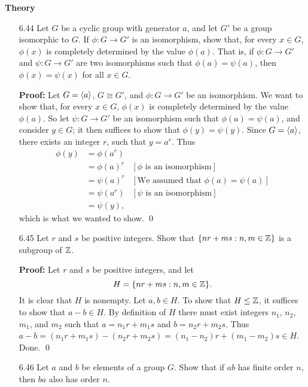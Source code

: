 \noindent      \textbf{Theory}

\begin{enumerate}
   \item[6.44] Let $G$ be a cyclic group with generator $a$, and let $G'$ be a
               group isomorphic to $G$. If $\phi : G \rightarrow G'$ is an
               isomorphism, show that, for every $x \in G$, $\phi(x)$ is
               completely determined by the value $\phi(a)$. That is, if
               $\phi : G \rightarrow G'$ and $\psi : G \rightarrow G'$ are two
               isomorphisms such that $\phi(a) = \psi(a)$, then
               $\phi(x) = \psi(x)$ for all $x \in G$.

      \textbf{Proof:} Let $G = \langle a \rangle$, $G \cong G'$, and
      $\phi : G \rightarrow G'$ be an isomorphism. We want to show that, for 
      every $x \in G$, $\phi(x)$ is completely determined by the value
      $\phi(a)$. So let $\psi :  G \rightarrow G'$ be an isomorphism such that
      $\phi(a) = \psi(a)$, and consider $y \in G$; it then suffices to show
      that $\phi(y) = \psi(y)$. Since $G = \langle a \rangle$, there exists an integer
      $r$, such that $y = a^r$. Thus
      \begin{align*}
         \phi(y) &= \phi(a^r) \\
                 &= \phi(a)^r &[\phi \text{ is an isomorphism}] \\
                 &= \psi(a)^r &[\text{We assumed that }\phi(a) = \psi(a)] \\
                 &= \psi(a^r) &[\psi \text{ is an isomorphism}] \\
                 &= \psi(y),
      \end{align*}
      which is what we wanted to show. \qed
   \item[6.45] Let $r$ and $s$ be positive integers. Show that
               $\{nr + ms : n, m \in \mathbb{Z}\}$ is a subgroup of $\mathbb{Z}$.

      \textbf{Proof:} Let $r$ and $s$ be positive integers, and let
      $$H = \{nr + ms : n, m \in \mathbb{Z}\}.$$
      It is clear that $H$ is nonempty. Let $a, b \in H$. To show that
      $H \le \mathbb{Z}$, it suffices to show that $a - b \in H$. By definition of $H$
      there must exist integers $n_1$, $n_2$, $m_1$, and $m_2$ such that
      $a = n_1r + m_1s$ and $b = n_2r + m_2s$. Thus $a - b = (n_1r + m_1s) - 
      (n_2r + m_2s) = (n_1 - n_2)r + (m_1 - m_2)s \in H$. Done. \qed
   \item[6.46] Let $a$ and $b$ be elements of a group $G$. Show that if $ab$
               has finite order $n$, then $ba$ also has order $n$.


\end{enumerate}

